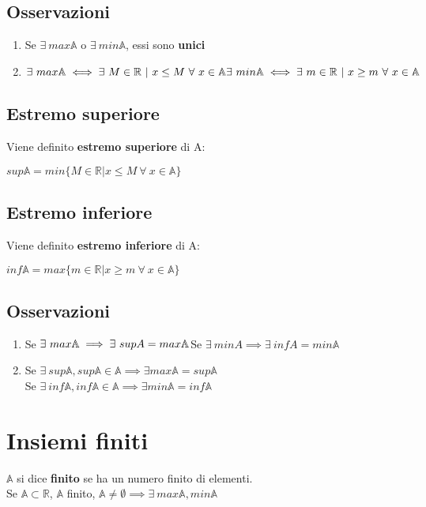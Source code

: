 \subsection{Osservazioni}
\begin{enumerate}
\item Se $\exists\ max\mathbb{A}$ o $\exists\ min\mathbb{A}$, essi sono \textbf{unici}
\item $\exists\ max\mathbb{A} \iff \exists\ M \in \mathbb{R}\ |\ x \leq M\ \forall\ x \in \mathbb{A}\\
\exists\ min\mathbb{A} \iff \exists\ m \in \mathbb{R}\ |\ x \geq m\ \forall\ x \in \mathbb{A}$
\end{enumerate}
\subsection{Estremo superiore}
Viene definito \textbf{estremo superiore} di A:\\
\begin{Large}
$sup\mathbb{A} = min\{M \in \mathbb{R} | x \leq M\ \forall\ x \in \mathbb{A}\}$
\end{Large}
\subsection{Estremo inferiore}
Viene definito \textbf{estremo inferiore} di A:\\
\begin{Large}
$inf\mathbb{A} = max\{m \in \mathbb{R} | x \geq m\ \forall\ x \in \mathbb{A}\}$
\end{Large}
\subsection{Osservazioni}
\begin{enumerate}
\item Se $\exists\ max\mathbb{A} \implies \exists\ supA=max\mathbb{A}\\
$Se $\exists\ minA \implies \exists\ infA=min\mathbb{A}$
\item Se $\exists\ sup\mathbb{A}, sup\mathbb{A} \in \mathbb{A} \implies \exists max\mathbb{A} = sup\mathbb{A}$\\
Se $\exists\ inf\mathbb{A}, inf\mathbb{A} \in \mathbb{A} \implies \exists min\mathbb{A} = inf\mathbb{A}$
\end{enumerate}

\section{Insiemi finiti}
$\mathbb{A}$ si dice \textbf{finito} se ha un numero finito di elementi.\\
Se $\mathbb{A} \subset \mathbb{R}$, $\mathbb{A}$ finito, $\mathbb{A} \neq \emptyset \implies \exists\ max\mathbb{A}, min\mathbb{A}$

